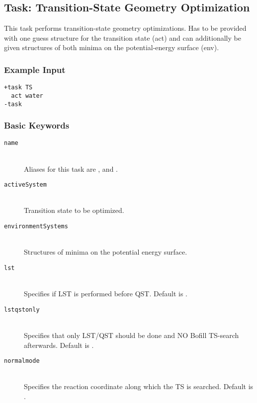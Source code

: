 \subsection{Task: Transition-State Geometry Optimization}
This task performs transition-state geometry optimizations. Has to be provided with one guess structure for the transition state (act) and can additionally be given structures of both minima on the potential-energy surface (env).
\subsubsection{Example Input}
\begin{lstlisting}
+task TS
  act water
-task
\end{lstlisting}
\subsubsection{Basic Keywords}
\begin{description}
  \item [\texttt{name}]\hfill \\
    Aliases for this task are ,  and .
  \item [\texttt{activeSystem}]\hfill \\
    Transition state to be optimized.
  \item [\texttt{environmentSystems}]\hfill \\
    Structures of minima on the potential energy surface.
  \item [\texttt{lst}]\hfill \\
    Specifies if LST is performed before QST. Default is .
  \item [\texttt{lstqstonly}]\hfill \\
    Specifies that only LST/QST should be done and NO Bofill TS-search afterwards. Default is .
  \item [\texttt{normalmode}]\hfill \\
    Specifies the reaction coordinate along which the TS is searched. Default is .
\end{description}